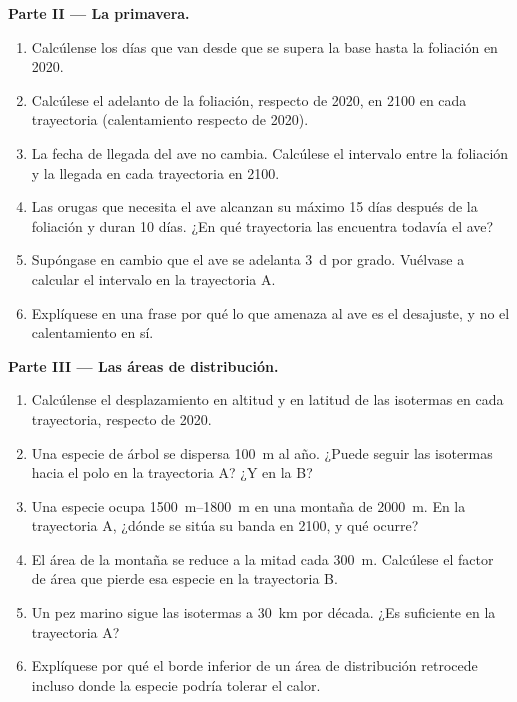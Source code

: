 \begin{problem}
\medskip
\noindent\textbf{Parte II --- La primavera.}
\begin{enumerate}[resume]
  \item Calcúlense los días que van desde que se supera la base hasta la
        foliación en 2020.
  \item Calcúlese el adelanto de la foliación, respecto de 2020, en 2100
        en cada trayectoria (calentamiento respecto de 2020).
  \item La fecha de llegada del ave no cambia. Calcúlese el intervalo entre
        la foliación y la llegada en cada trayectoria en 2100.
  \item Las orugas que necesita el ave alcanzan su máximo 15 días después
        de la foliación y duran 10 días. ¿En qué trayectoria las encuentra
        todavía el ave?
  \item Supóngase en cambio que el ave se adelanta \qty{3}{d} por
        grado. Vuélvase a calcular el intervalo en la trayectoria A.
  \item Explíquese en una frase por qué lo que amenaza al ave es el
        desajuste, y no el calentamiento en sí.
\end{enumerate}

\medskip
\noindent\textbf{Parte III --- Las áreas de distribución.}
\begin{enumerate}[resume]
  \item Calcúlense el desplazamiento en altitud y en latitud de las
        isotermas en cada trayectoria, respecto de 2020.
  \item Una especie de árbol se dispersa \qty{100}{m} al año. ¿Puede
        seguir las isotermas hacia el polo en la trayectoria A? ¿Y en la B?
  \item Una especie ocupa \qtyrange{1500}{1800}{m} en una montaña de
        \qty{2000}{m}. En la trayectoria A, ¿dónde se sitúa su banda en
        2100, y qué ocurre?
  \item El área de la montaña se reduce a la mitad cada \qty{300}{m}.
        Calcúlese el factor de área que pierde esa especie en la
        trayectoria B.
  \item Un pez marino sigue las isotermas a \qty{30}{km} por década. ¿Es
        suficiente en la trayectoria A?
  \item Explíquese por qué el borde inferior de un área de distribución
        retrocede incluso donde la especie podría tolerar el calor.
\end{enumerate}


\end{problem}
